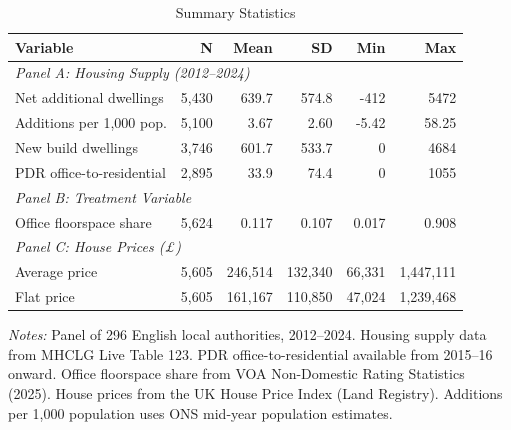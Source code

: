 \begin{table}[htbp]
\centering
\caption{Summary Statistics}
\label{tab:sumstats}
\begin{tabular}{lrrrrr}
\hline\hline
Variable & N & Mean & SD & Min & Max \\
\hline
\multicolumn{6}{l}{\textit{Panel A: Housing Supply (2012--2024)}} \\
Net additional dwellings & 5,430 & 639.7 & 574.8 & -412 & 5472 \\
Additions per 1,000 pop. & 5,100 & 3.67 & 2.60 & -5.42 & 58.25 \\
New build dwellings & 3,746 & 601.7 & 533.7 & 0 & 4684 \\
PDR office-to-residential & 2,895 & 33.9 & 74.4 & 0 & 1055 \\
\hline
\multicolumn{6}{l}{\textit{Panel B: Treatment Variable}} \\
Office floorspace share & 5,624 & 0.117 & 0.107 & 0.017 & 0.908 \\
\hline
\multicolumn{6}{l}{\textit{Panel C: House Prices (\pounds)}} \\
Average price & 5,605 & 246,514 & 132,340 & 66,331 & 1,447,111 \\
Flat price & 5,605 & 161,167 & 110,850 & 47,024 & 1,239,468 \\
\hline\hline
\end{tabular}
\begin{minipage}{0.95\textwidth}
\vspace{0.3em}
\footnotesize
\textit{Notes:} Panel of 296 English local authorities, 2012--2024. Housing supply data from MHCLG Live Table 123. PDR office-to-residential available from 2015--16 onward. Office floorspace share from VOA Non-Domestic Rating Statistics (2025). House prices from the UK House Price Index (Land Registry). Additions per 1,000 population uses ONS mid-year population estimates.
\end{minipage}
\end{table}
